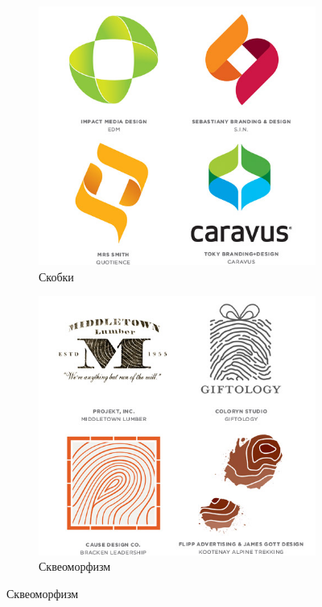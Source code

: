 \begin{figure}[h!]
  \ContinuedFloat
  \centering
  \begin{subfigure}{.45\textwidth}
    \centering
    \includegraphics[width=\linewidth]{images/supplement/logolounge/2013/Skobki}
    \caption[]{Скобки}
    \label{fig:logolounge:2013:skobki}
  \end{subfigure}
  \hfill
  \centering
  \begin{subfigure}{.45\textwidth}
    \centering
    \includegraphics[width=\linewidth]{images/supplement/logolounge/2013/Skveomorfism}
    \caption[]{Сквеоморфизм}
    \label{fig:logolounge:2013:skveomorfism}
  \end{subfigure}


\end{figure}
